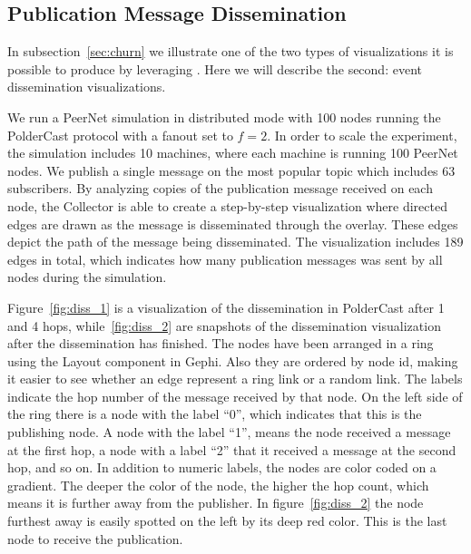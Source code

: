 \subsection{Publication Message Dissemination}
\label{sec:dissviz}


In subsection~\ref{sec:churn} we illustrate one of the two types of
visualizations it is possible to produce by leveraging \demo. Here we will describe the second:
event dissemination visualizations.

We run a PeerNet simulation in distributed mode with 100 nodes running
the PolderCast protocol with a fanout set to $f=2$. In order to scale
the experiment, the simulation includes 10 machines, where each machine
is running 100 PeerNet nodes.  We publish a single message on the
most popular topic which includes 63 subscribers. By analyzing copies of
the publication message received on each node, the Collector is able to
create a step-by-step visualization where directed edges are drawn as
the message is disseminated through the overlay.  These edges depict the
path of the message being disseminated. The visualization includes 189
edges in total, which indicates how many publication messages was sent
by all nodes during the simulation.

Figure~\ref{fig:diss_1} is a visualization of the dissemination in
PolderCast after 1 and 4 hops, while~\ref{fig:diss_2} are snapshots of
the dissemination visualization after the dissemination has finished.
The nodes have been arranged in a ring using the Layout component in
Gephi. Also they are ordered by node id, making it easier to see whether
an edge represent a ring link or a random link. The labels indicate the
hop number of the message received by that node. On the left side of the
ring there is a node with the label ``0'', which indicates that this is
the publishing node. A node with the label ``1'', means the node
received a message at the first hop, a node with a label ``2'' that it
received a message at the second hop, and so on. In addition to numeric
labels, the nodes are color coded on a gradient. The deeper the color of
the node, the higher the hop count, which means it is further away from
the publisher. In figure~\ref{fig:diss_2} the node furthest away is
easily spotted on the left by its deep red color. This is the last node
to receive the publication.

